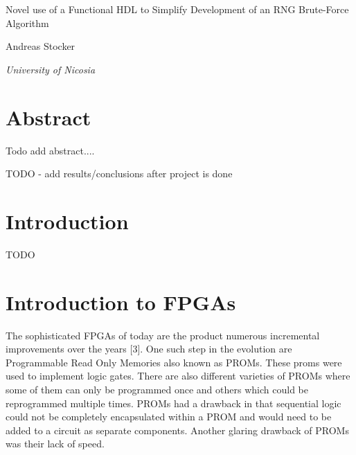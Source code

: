 \documentclass{article}
\begin{document}
    \begin{center}
    \end{center}
    
    \addvspace{20mm}
        
    \begin{center}
        \huge Novel use of a Functional HDL to Simplify Development of an RNG Brute-Force Algorithm
    \end{center}
    
    \begin{center}
    \end{center}
       
    \begin{center}
        \large Andreas Stocker
    \end{center}
    
    \begin{center}
        \small \emph {University of Nicosia}
    \end{center}

    \addvspace{15mm}

    \section*{Abstract}

    Todo add abstract....
    
    TODO - add results/conclusions after project is done

    \section{Introduction}

    TODO

    \break

    \section{Introduction to FPGAs}

    The sophisticated FPGAs of today are the product numerous incremental improvements
    over the years [3]. One such step in the evolution are Programmable Read Only Memories
    also known as PROMs. These proms were used to implement logic gates. There are also
    different varieties of PROMs where some of them can only be programmed once and
    others which could be reprogrammed multiple times. PROMs had a drawback in that
    sequential logic could not be completely encapsulated within a PROM and would need
    to be added to a circuit as separate components. Another glaring drawback of PROMs was
    their lack of speed.
\end{document}
